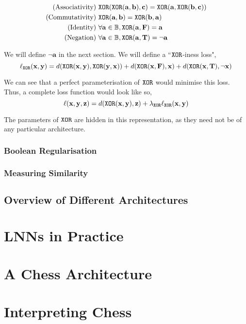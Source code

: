 \documentclass[conference]{report}
\begin{document}
$$
\begin{aligned}
\text{(Associativity)}&\ \texttt{XOR}(\texttt{XOR}(\mathbf{a, b}), \mathbf{c}) = \texttt{XOR}(\mathbf{a}, \texttt{XOR}(\mathbf{b, c})) \\
\text{(Commutativity)}&\ \texttt{XOR}(\mathbf{a, b}) = \texttt{XOR}(\mathbf{b, a}) \\
\text{(Identity)}&\ \forall \mathbf{a} \in \mathbb{B}, \texttt{XOR}(\mathbf{a}, \textbf{F}) = \mathbf{a} \\
\text{(Negation)}&\ \forall \mathbf{a} \in \mathbb{B}, \texttt{XOR}(\mathbf{a}, \textbf{T}) = \lnot \mathbf{a}
\end{aligned}
$$

We will define $\lnot\mathbf{a}$ in the next section. We will define a ``$\texttt{XOR}$-iness loss",
$$\ell_{\texttt{XOR}}(\mathbf{x,y}) = d(\texttt{XOR}(\mathbf{x, y}),\texttt{XOR}(\mathbf{y, x})) + d(\texttt{XOR}(\mathbf{x}, \textbf{F}), \mathbf{x}) + d(\texttt{XOR}(\mathbf{x}, \textbf{T}), \lnot \mathbf{x})$$

We can see that a perfect parameterisation of $\texttt{XOR}$ would minimise this loss. Thus, a complete loss function would look like so,
$$\ell(\mathbf{x,y,z}) = d(\texttt{XOR}(\mathbf{x,y}),\mathbf{z}) + \lambda_{\texttt{XOR}} \ell_{\texttt{XOR}}(\mathbf{x,y})$$

The parameters of $\texttt{XOR}$ are hidden in this representation, as they need not be of any particular architecture.

\subsection{Boolean Regularisation}

\subsection{Measuring Similarity}
 
\section{Overview of Different Architectures}
 
\chapter{LNNs in Practice} 

\chapter{A Chess Architecture}

\chapter{Interpreting Chess}
\end{document}
